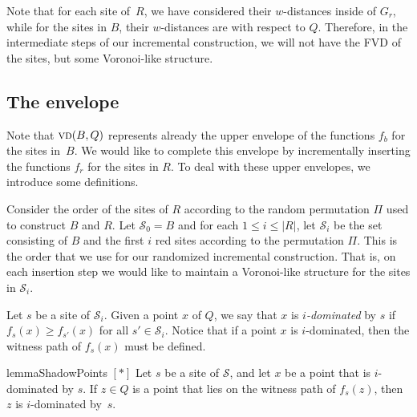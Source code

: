 \documentclass[a4paper,UKenglish]{socg-lipics-v2018}
\newcommand{\idom}[1][i]{${#1}$-dominated\xspace}
\newcommand{\s}{\mathcal S}
\newcommand{\vd}[2][P]{\textsc{vd}(#2, #1)}
\begin{document}

Note that for each site of~$R$, we have considered their $w$-distances inside of $G_r$, while for the sites in $B$, their $w$-distances are with respect to $Q$.
Therefore, in the intermediate steps of our incremental construction, we will not have the FVD of the sites, but some Voronoi-like structure.



\subsection{The envelope}
Note that $\vd[Q]{B}$ represents already the upper envelope of the functions $f_b$ for the sites in~$B$. 
We would like to complete this envelope by incrementally inserting the functions $f_r$ for the sites in $R$.
To deal with these upper envelopes, we introduce some definitions.




Consider the order of the sites of $R$ according to the random permutation $\Pi$ used to construct $B$ and $R$.
Let $\s_0 = B$ and for each $1\leq i\leq |R|$, let $\s_i$ be the set consisting of $B$ and the first $i$ red sites according to the permutation $\Pi$.
This is the order that we use for our randomized incremental construction. 
That is, on each insertion step we would like to maintain a Voronoi-like structure for the sites in $\s_i$.

Let $s$ be a site of $\s_i$.
Given a point $x$ of $Q$, we say that $x$ is \emph{\idom} by $s$ if $f_s(x) \geq f_{s'}(x)$ for all $s'\in \s_i$.
Notice that if a point $x$ is \idom, then the witness path of $f_s(x)$ must be defined. 


\begin{restatable}{lemma}{ShadowPoints}\label{lemma:Shadow points}
\hyperref[ProofShadowPoints]{$[*]$}
Let $s$ be a site of $\s$, and let $x$ be a point that is \idom by $s$. If $z\in Q$ is a point that lies on the witness path of $f_s(z)$,
then $z$ is \idom by~$s$. 
\end{restatable}
\end{document}
